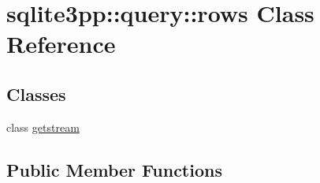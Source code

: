 \hypertarget{classsqlite3pp_1_1query_1_1rows}{\section{sqlite3pp\-:\-:query\-:\-:rows Class Reference}
\label{classsqlite3pp_1_1query_1_1rows}
}
\subsection*{Classes}
\begin{DoxyCompactItemize}
\item 
class \hyperlink{classsqlite3pp_1_1query_1_1rows_1_1getstream}{getstream}
\end{DoxyCompactItemize}
\subsection*{Public Member Functions}
